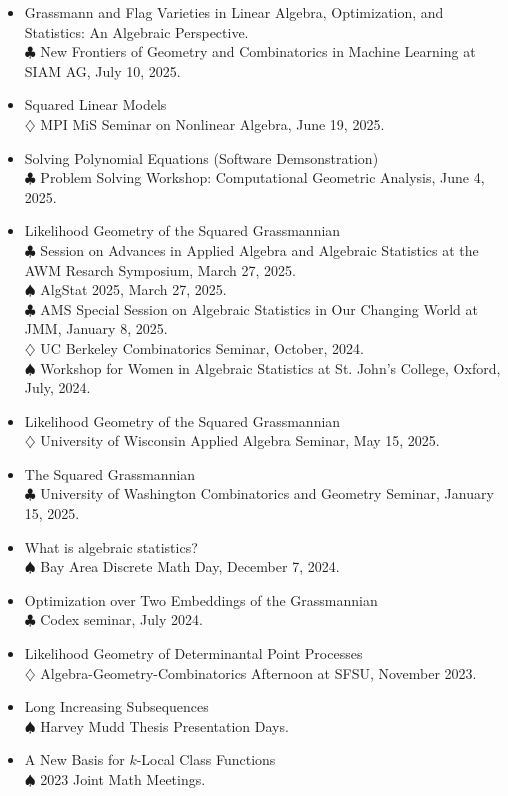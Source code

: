 \documentclass[11pt]{article}
\begin{document}
\begin{itemize}
\item Grassmann and Flag Varieties in Linear Algebra, Optimization, and Statistics: An Algebraic Perspective.\\
  $\clubsuit$ New Frontiers of Geometry and Combinatorics in Machine Learning at SIAM AG, July 10, 2025.
\item Squared Linear Models\\
  $\diamondsuit$ MPI MiS Seminar on Nonlinear Algebra, June 19, 2025.
\item Solving Polynomial Equations (Software Demsonstration)\\
  $\clubsuit$  Problem Solving Workshop: Computational Geometric Analysis, June 4, 2025.
\item Likelihood Geometry of the Squared Grassmannian\\
  $\clubsuit$ Session on Advances in Applied Algebra and Algebraic Statistics at the AWM Resarch Symposium, March 27, 2025.\\    
  $\spadesuit$ AlgStat 2025, March 27, 2025.\\  
  $\clubsuit$ AMS Special Session on Algebraic Statistics in Our Changing World at JMM, January 8, 2025.\\
  $\diamondsuit$ UC Berkeley Combinatorics Seminar, October, 2024.\\
  $\spadesuit$ Workshop for Women in Algebraic Statistics at St. John's College, Oxford, July, 2024.
\item Likelihood Geometry of the Squared Grassmannian\\
  $\diamondsuit$ University of Wisconsin Applied Algebra Seminar, May 15, 2025.
\item The Squared Grassmannian\\
  $\clubsuit$ University of Washington Combinatorics and Geometry Seminar, January 15, 2025.
\item What is algebraic statistics?\\
  $\spadesuit$ Bay Area Discrete Math Day, December 7, 2024. 
\item Optimization over Two Embeddings of the Grassmannian\\
  $\clubsuit$ Codex seminar, July 2024. 
\item Likelihood Geometry of Determinantal Point Processes\\
  $\diamondsuit$ Algebra-Geometry-Combinatorics Afternoon at SFSU, November 2023.
\item Long Increasing Subsequences\\
  $\spadesuit$ Harvey Mudd Thesis Presentation Days.
\item A New Basis for $k$-Local Class Functions\\
  $\spadesuit$ 2023 Joint Math Meetings.
\end{itemize}
\end{document}
